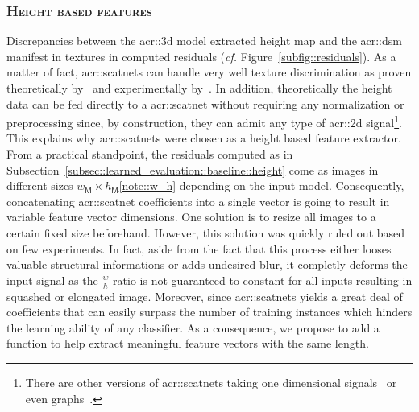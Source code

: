         \subsubsection{\textsc{Height based features}}
            Discrepancies between the \gls{acr::3d} model extracted height map and the \gls{acr::dsm} manifest in textures in computed residuals (\textit{cf.} Figure~\ref{subfig::residuals}).
            As a matter of fact, \glspl{acr::scatnet} can handle very well texture discrimination as proven theoretically by~\textcite{mallat2012group} and experimentally by~\textcite{bruna2013invariant,sifre2013rotation}.
            In addition, theoretically the height data can be fed directly to a \gls{acr::scatnet} without requiring any normalization or preprocessing since, by construction, they can admit any type of \gls{acr::2d} signal\footnote{There are other versions of \glspl{acr::scatnet} taking one dimensional signals~\parencite{anden2014deep} or even graphs~\parencite{eickenberg2018solid}.}.
            This explains why \glspl{acr::scatnet} were chosen as a height based feature extractor.\\

            From a practical standpoint, the residuals computed as in Subsection~\ref{subsec::learned_evaluation::baseline::height} come as images in different sizes \(w_{\mathsf{M}} \times h_{\mathsf{M}}\)\cref{note::w_h} depending on the input model.
            Consequently, concatenating \gls{acr::scatnet} coefficients into a single vector is going to result in variable feature vector dimensions.
            One solution is to resize all images to a certain fixed size beforehand.
            However, this solution was quickly ruled out based on few experiments.
            In fact, aside from the fact that this process either looses valuable structural informations or adds undesired blur, it completly deforms the input signal as the \(\frac{w}{h}\) ratio is not guaranteed to constant for all inputs resulting in squashed or elongated image.
            Moreover, since \glspl{acr::scatnet} yields a great deal of coefficients that can easily surpass the number of training instances which hinders the learning ability of any classifier.
            As a consequence, we propose to add a function to help extract meaningful feature vectors with the same length.\\

